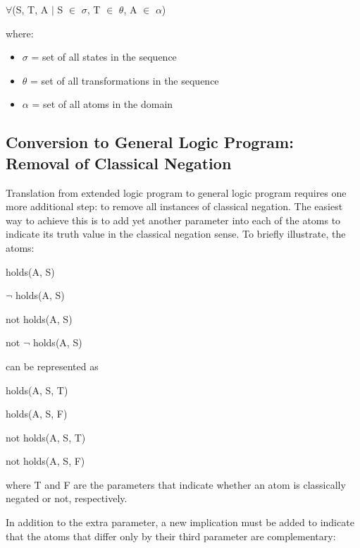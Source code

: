 \documentclass[a4paper]{article}
\begin{document}
        $\forall$(S, T, A $\mid$ S $\in$ $\sigma$, T $\in$ $\theta$, A $\in$ 
        $\alpha$)

        where: 

        \begin{itemize}
          \item $\sigma$ = set of all states in the sequence
          \item $\theta$ = set of all transformations in the sequence
          \item $\alpha$ = set of all atoms in the domain
        \end{itemize}

    \subsection{Conversion to General Logic Program: Removal of Classical Negation}

      Translation from extended logic program to general logic program 
      requires one more additional step: to remove all instances of classical 
      negation. The easiest way to achieve this is to add yet another parameter
      into each of the atoms to indicate its truth value in the classical
      negation sense. To briefly illustrate, the atoms:

      \begin{list}{}{}
        \item holds(A, S)
        \item $\lnot$ holds(A, S)
        \item not holds(A, S)
        \item not $\lnot$ holds(A, S)
      \end{list}

      can be represented as

      \begin{list}{}{}
        \item holds(A, S, T)
        \item holds(A, S, F)
        \item not holds(A, S, T)
        \item not holds(A, S, F)
      \end{list}

      where T and F are the parameters that indicate whether an atom is
      classically negated or not, respectively.

      In addition to the extra parameter, a new implication must be added
      to indicate that the atoms that differ only by their third parameter
      are complementary:
\end{document}
